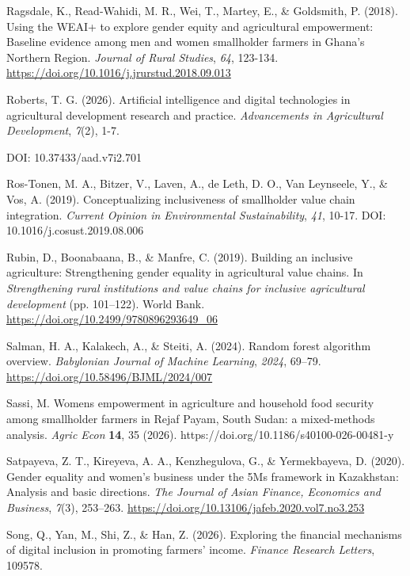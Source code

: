 ﻿\documentclass[sn-mathphys-num]{sn-jnl}
\newcommand{\hl}[1]{#1}
\begin{document}
\hl{Ragsdale, K., Read-Wahidi, M. R., Wei, T., Martey, E., \& Goldsmith,
P. (2018). Using the WEAI+ to explore gender equity and agricultural
empowerment: Baseline evidence among men and women smallholder farmers
in Ghana's Northern Region. \emph{Journal of Rural Studies}, \emph{64},
123-134.}
\href{https://doi.org/10.1016/j.jrurstud.2018.09.013}{\hl{https://doi.org/10.1016/j.jrurstud.2018.09.013}}

\hl{Roberts, T. G. (2026). Artificial intelligence and digital
technologies in agricultural development research and practice.
\emph{Advancements in Agricultural Development}, \emph{7}(2), 1-7.}

\hl{DOI: 10.37433/aad.v7i2.701}

\hl{Ros-Tonen, M. A., Bitzer, V., Laven, A., de Leth, D. O., Van
Leynseele, Y., \& Vos, A. (2019). Conceptualizing inclusiveness of
smallholder value chain integration. \emph{Current Opinion in
Environmental Sustainability}, \emph{41}, 10-17.
DOI: 10.1016/j.cosust.2019.08.006}

\hl{Rubin, D., Boonabaana, B., \& Manfre, C. (2019). Building an
inclusive agriculture: Strengthening gender equality in agricultural
value chains. In \emph{Strengthening rural institutions and value chains
for inclusive agricultural development} (pp. 101--122). World Bank.}
\href{https://doi.org/10.2499/9780896293649_06}{\hl{https://doi.org/10.2499/9780896293649\_06}}

\hl{Salman, H. A., Kalakech, A., \& Steiti, A. (2024). Random forest
algorithm overview. \emph{Babylonian Journal of Machine Learning},
\emph{2024}, 69--79.}
\href{https://doi.org/10.58496/BJML/2024/007.}{\hl{https://doi.org/10.58496/BJML/2024/007}}

\hl{Sassi, M. Women\textquotesingle s empowerment in agriculture and
household food security among smallholder farmers in Rejaf Payam, South
Sudan: a mixed-methods analysis. \emph{Agric Econ} \textbf{14}, 35
(2026). https://doi.org/10.1186/s40100-026-00481-y}

\hl{Satpayeva, Z. T., Kireyeva, A. A., Kenzhegulova, G., \&
Yermekbayeva, D. (2020). Gender equality and women's business under the
5Ms framework in Kazakhstan: Analysis and basic directions. \emph{The
Journal of Asian Finance, Economics and Business}, \emph{7}(3),
253--263.}
\href{https://doi.org/10.13106/jafeb.2020.vol7.no3.253}{\hl{https://doi.org/10.13106/jafeb.2020.vol7.no3.253}}

\hl{Song, Q., Yan, M., Shi, Z., \& Han, Z. (2026). Exploring the
financial mechanisms of digital inclusion in promoting farmers' income.
\emph{Finance Research Letters}, 109578.}
\end{document}
